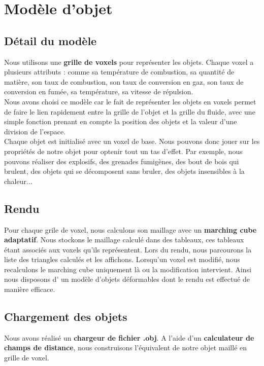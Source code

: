 \documentclass[a4paper,10pt]{article}
\begin{document}
\newpage
\section{Modèle d'objet}

\subsection{Détail du modèle}
Nous utilisons une \textbf{grille de voxels} pour représenter les objets. Chaque voxel
a plusieurs attributs : comme sa température de combustion, sa quantité de matière,
son taux de combustion, son taux de conversion en gaz, son taux de conversion en fumée,
sa température, sa vitesse de répulsion.\\
Nous avons choisi ce modèle car le fait de représenter les objets en voxels
permet de faire le lien rapidement entre la grille de l'objet et la grille du fluide,
avec une simple fonction prenant en compte la position des objets et la valeur d'une division
de l'espace.\\

Chaque objet est initialisé avec un voxel de base. Nous pouvons donc jouer sur les propriétés
de notre objet pour optenir tout un tas d'effet. Par exemple, nous pouvons réaliser des
explosifs, des grenades fumigènes, des bout de bois qui brulent, des objets
qui se décomposent sans bruler, des objets insensibles à la chaleur...

\subsection{Rendu}
Pour chaque grile de voxel, nous calculons son maillage avec un \textbf{marching cube adaptatif}.
Nous stockons le maillage calculé dans des tableaux, ces tableaux étant associés aux voxels
qu'ils représentent. Lors du rendu, nous parcourons la liste des triangles calculés
et les affichons. Lorsqu'un voxel est modifié, nous recalculons le marching cube uniquement
là ou la modification intervient. Ainsi nous disposons d' un modèle d'objets déformables
dont le rendu est effectué de manière efficace.

\subsection{Chargement des objets}
Nous avons réalisé un \textbf{chargeur de fichier .obj}. A l'aide d'un \textbf{calculateur de
champs de distance}, nous construisons l'équivalent de notre objet maillé en grille de voxel.
\end{document}
